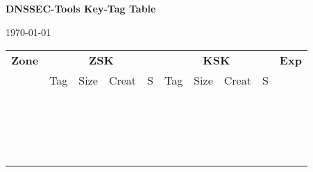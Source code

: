 \documentclass[12pt]{article}
\begin{document}
\begin{center}
{\Large {\bf DNSSEC-Tools Key-Tag Table}}
\end{center}
\hfill\today


\begin{center}
\begin{tabular}{|c|c|c|c|c|c|c|c|c|c|}
\hline
{\bf Zone} &
\multicolumn{4}{c|}{{\bf ZSK}} &
\multicolumn{4}{c|}{{\bf KSK}} &
{\bf Exp} \\
\cline{2-9}

 & Tag & Size & Creat & S & Tag & Size & Creat & S & \\
\hline

\hspace{1in} & \hspace{.5in} & \hspace{.5in} & \hspace{.5in} & & \hspace{.5in} & \hspace{.5in} & \hspace{.5in} & & \hspace{.5in} \\ 
 &  &  &  & &  &  &  & &  \\
 &  &  &  & &  &  &  & &  \\ \hline

 &  &  &  & &  &  &  & &  \\
 &  &  &  & &  &  &  & &  \\
 &  &  &  & &  &  &  & &  \\ \hline

 &  &  &  & &  &  &  & &  \\
 &  &  &  & &  &  &  & &  \\
 &  &  &  & &  &  &  & &  \\ \hline

 &  &  &  & &  &  &  & &  \\
 &  &  &  & &  &  &  & &  \\
 &  &  &  & &  &  &  & &  \\ \hline

 &  &  &  & &  &  &  & &  \\
 &  &  &  & &  &  &  & &  \\
 &  &  &  & &  &  &  & &  \\ \hline

 &  &  &  & &  &  &  & &  \\
 &  &  &  & &  &  &  & &  \\
 &  &  &  & &  &  &  & &  \\ \hline


\end{tabular}
\end{center}
\end{document}
